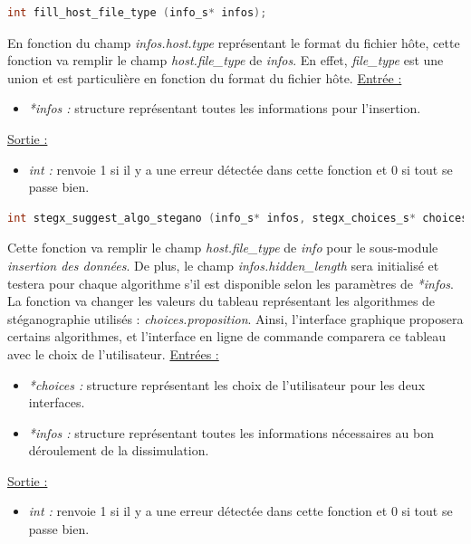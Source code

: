 \documentclass[11pt]{article}
\begin{document}
\begin{lstlisting}[language=c]
int fill_host_file_type (info_s* infos);
\end{lstlisting}

En fonction du champ \textit{infos.host.type} représentant le format du 
fichier hôte, cette fonction va remplir le champ \textit{host.file\_type} 
de \textit{infos}. En effet, \textit{file\_type} est une union et est 
particulière en fonction du format du fichier hôte. 
\newline
\underline{Entrée :} 
\begin{itemize}
\item \textit{*infos :} structure représentant toutes les informations pour 
l'insertion. 
\end{itemize}
\underline{Sortie :} 
\begin{itemize}
\item \textit{int :} renvoie 1 si il y a une erreur détectée dans cette 
fonction et 0 si tout se passe bien. 
\newline 
\end{itemize}


\begin{lstlisting}[language=c]
int stegx_suggest_algo_stegano (info_s* infos, stegx_choices_s* choices);
\end{lstlisting}

Cette fonction va remplir le champ \textit{host.file\_type} 
de \textit{info} pour le sous-module \textit{insertion des données}. 
De plus, le champ \textit{infos.hidden\_length} sera initialisé et testera 
pour chaque algorithme s'il est disponible selon les paramètres de \textit{*infos}. 
La fonction va changer les valeurs du tableau représentant les algorithmes 
de stéganographie utilisés : \textit{choices.proposition}. 
Ainsi, l'interface graphique proposera certains algorithmes, et l'interface 
en ligne de commande comparera ce tableau avec le choix de l'utilisateur. 
\newline
\underline{Entrées :}
\begin{itemize}
\item \textit{*choices :} structure représentant les choix de 
l'utilisateur pour les deux interfaces. 
\item \textit{*infos :} structure représentant toutes les informations 
nécessaires au bon déroulement de la dissimulation. 
\end{itemize}
\underline{Sortie :} 
\begin{itemize}
\item \textit{int :} renvoie 1 si il y a une erreur détectée dans cette 
fonction et 0 si tout se passe bien. 
\newline 
\end{itemize}
\end{document}
